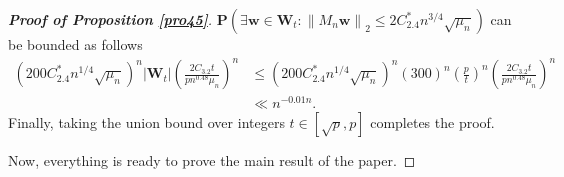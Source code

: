 \documentclass{article}
\numberwithin{equation}{section}
\theoremstyle{plain}
\begin{document}
\begin{proof}[\bf Proof of Proposition \ref{pro45}]
$\textbf{P}\left(\exists \boldsymbol{w} \in \boldsymbol{W}_t:\left\|M_n \boldsymbol{w}\right\|_2 \leq 2 C^*_{2.4} n^{3 / 4}\sqrt{\mu_{n}}\right)$ can be bounded as follows
\begin{align*}
\left(200 C^*_{2.4} n^{1 / 4}\sqrt{\mu_{n}}\right)^n\left|\boldsymbol{W}_t\right|\left(\frac{2 C_{3.2} t}{p n^{0.48}\mu_{n}}\right)^n & \leq\left(200 C^*_{2.4} n^{1 / 4}\sqrt{\mu_{n}}\right)^n(300)^n\left(\frac{p}{t}\right)^n\left(\frac{2 C_{3.2} t}{p n^{0.48}\mu_{n}}\right)^n \\
& \ll n^{-0.01 n}.
\end{align*}
Finally, taking the union bound over integers $t \in[\sqrt{p}, p]$ completes the proof.
\par
Now, everything is ready to prove the main result of the paper.
\end{proof}
\end{document}
